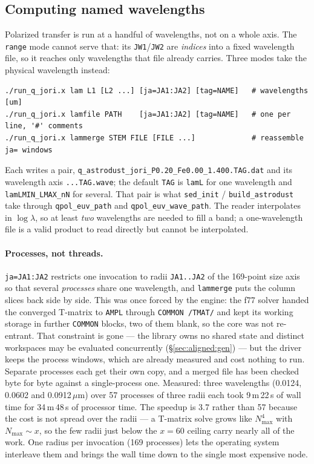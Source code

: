 \documentclass{my_memo}
\newcommand{\code}[1]{\texttt{#1}}
\newcommand{\um}{\ensuremath{\,\mu\mathrm{m}}}
\begin{document}
\subsection{Computing named wavelengths}\label{sec:namedlam}

Polarized transfer is run at a handful of wavelengths, not on a whole axis. The
\code{range} mode cannot serve that: its \code{JW1}/\code{JW2} are \emph{indices}
into a fixed wavelength file, so it reaches only wavelengths that file already
carries. Three modes take the physical wavelength instead:
\begin{lstlisting}[style=sh]
./run_q_jori.x lam L1 [L2 ...] [ja=JA1:JA2] [tag=NAME]   # wavelengths [um]
./run_q_jori.x lamfile PATH    [ja=JA1:JA2] [tag=NAME]   # one per line, '#' comments
./run_q_jori.x lammerge STEM FILE [FILE ...]             # reassemble ja= windows
\end{lstlisting}
Each writes a pair, \code{q\_astrodust\_jori\_P0.20\_Fe0.00\_1.400.TAG.dat} and
its wavelength axis \code{...TAG.wave}; the default \code{TAG} is \code{lamL} for
one wavelength and \code{lamLMIN\_LMAX\_nN} for several. That pair is what
\code{sed\_init} / \code{build\_astrodust} take through \code{qpol\_euv\_path} and
\code{qpol\_euv\_wave\_path}. The reader interpolates in $\log\lambda$, so at
least \emph{two} wavelengths are needed to fill a band; a one-wavelength file is
a valid product to read directly but cannot be interpolated.

\paragraph{Processes, not threads.} \code{ja=JA1:JA2} restricts one invocation to
radii \code{JA1..JA2} of the 169-point size axis so that several \emph{processes}
share one wavelength, and \code{lammerge} puts the column slices back side by
side. This was once forced by the engine: the f77 solver handed the converged
T-matrix to \code{AMPL} through \code{COMMON /TMAT/} and kept its working storage
in further \code{COMMON} blocks, two of them blank, so the core was not
re-entrant. That constraint is gone --- the library owns no shared state and
distinct workspaces may be evaluated concurrently
(\S\ref{sec:aligned:gen}) --- but the driver keeps the process windows, which are
already measured and cost nothing to run. Separate processes each get their own
copy, and a merged file has been checked byte for
byte against a single-process one. Measured: three wavelengths (0.0124, 0.0602 and
0.0912\um) over 57 processes of three radii each took 9\,m\,22\,s of wall time for
34\,m\,48\,s of processor time. The speedup is 3.7 rather than 57 because the cost
is not spread over the radii --- a T-matrix solve grows like $N_{\max}^4$ with
$N_{\max}\sim x$, so the few radii just below the $x = 60$ ceiling carry nearly
all of the work. One radius per invocation (169 processes) lets the operating
system interleave them and brings the wall time down to the single most expensive
node.
\end{document}
